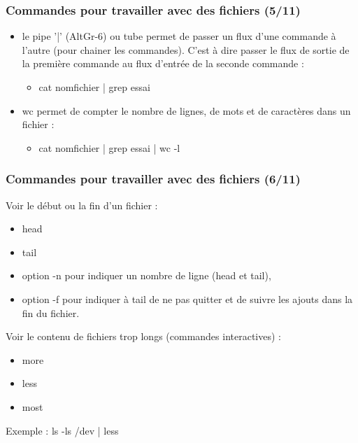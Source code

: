\documentclass[handout,10pt]{beamer}
\begin{document}
\frame
{
    \frametitle{Commandes pour travailler avec des fichiers (5/11)}

    \begin{itemize}
        \item le pipe '{\ttfamily |}' (AltGr-6) ou tube permet de passer un flux d'une commande à l'autre
              (pour chainer les commandes). C'est à dire passer le flux de sortie de la première commande
              au flux d'entrée de la seconde commande :
            \begin{itemize}
                \item  {\ttfamily cat nomfichier | grep essai}
            \end{itemize}
        \item {\ttfamily wc} permet de compter le nombre de lignes, de mots et de caractères dans un fichier :
            \begin{itemize}
                \item  {\ttfamily cat nomfichier | grep essai | wc -l}
            \end{itemize}
    \end{itemize}
}


\frame
{
    \frametitle{Commandes pour travailler avec des fichiers (6/11)}

    Voir le début ou la fin d'un fichier :

    \begin{itemize}
        \item {\ttfamily head}
        \item {\ttfamily tail}
    \end{itemize}

    \begin{itemize}
        \item option -n pour indiquer un nombre de ligne (head et tail),
        \item option -f pour indiquer à tail de ne pas quitter et de suivre les
              ajouts dans la fin du fichier.
    \end{itemize}

    Voir le contenu de fichiers trop longs (commandes interactives) :

    \begin{itemize}
        \item {\ttfamily more}
        \item {\ttfamily less}
        \item {\ttfamily most}
    \end{itemize}

    Exemple : {\ttfamily ls -ls /dev | less}
}
\end{document}
